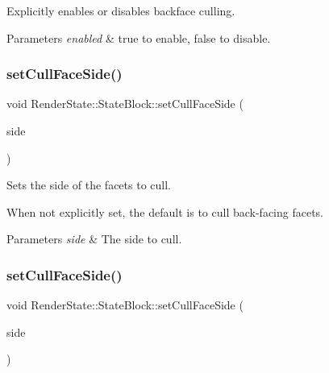 Explicitly enables or disables backface culling.


\begin{DoxyParams}{Parameters}
{\em enabled} & true to enable, false to disable. \\
\hline
\end{DoxyParams}
\mbox{\label{classRenderState_1_1StateBlock_af8d4f7b418f321ed9a275ded0cbe5ec4}} 
\subsubsection{\texorpdfstring{set\+Cull\+Face\+Side()}{setCullFaceSide()}\hspace{0.1cm}{\footnotesize\ttfamily [1/2]}}
{\footnotesize\ttfamily void Render\+State\+::\+State\+Block\+::set\+Cull\+Face\+Side (\begin{DoxyParamCaption}\item[{\hyperlink{classRenderState_a9b99d2625b13af77f1f8fa8101e3ad85}{Cull\+Face\+Side}}]{side }\end{DoxyParamCaption})}

Sets the side of the facets to cull.

When not explicitly set, the default is to cull back-\/facing facets.


\begin{DoxyParams}{Parameters}
{\em side} & The side to cull. \\
\hline
\end{DoxyParams}
\mbox{\label{classRenderState_1_1StateBlock_af8d4f7b418f321ed9a275ded0cbe5ec4}} 
\subsubsection{\texorpdfstring{set\+Cull\+Face\+Side()}{setCullFaceSide()}\hspace{0.1cm}{\footnotesize\ttfamily [2/2]}}
{\footnotesize\ttfamily void Render\+State\+::\+State\+Block\+::set\+Cull\+Face\+Side (\begin{DoxyParamCaption}\item[{\hyperlink{classRenderState_a9b99d2625b13af77f1f8fa8101e3ad85}{Cull\+Face\+Side}}]{side }\end{DoxyParamCaption})}

